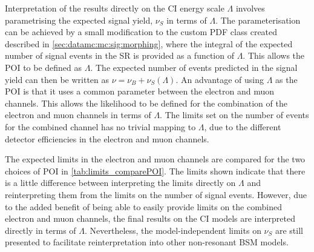 Interpretation of the results directly on the CI energy scale $\Lambda$ involves parametrising the expected signal yield, $\nu_S$ in terms of $\Lambda$. The parameterisation can be achieved by a small modification to the custom PDF class created described in \cref{sec:datamc:mc:sig:morphing}, where the integral of the expected number of signal events in the SR is provided as a function of $\Lambda$. This allows the POI to be defined as $\Lambda$. The expected number of events predicted in the signal yield can then be written as $\nu = \nu_B +\nu_S(\Lambda)$. An advantage of using $\Lambda$ as the POI is that it uses a common parameter between the electron and muon channels. This allows the likelihood to be defined for the combination of the electron and muon channels in terms of $\Lambda$. The limits set on the number of events for the combined channel has no trivial mapping to $\Lambda$, due to the different detector efficiencies in the electron and muon channels.  

The expected limits in the electron and muon channels are compared for the two choices of POI in \cref{tab:limits_comparePOI}. The limits shown indicate that there is a little difference between interpreting the limits directly on $\Lambda$ and reinterpreting them from the limits on the number of signal events. However, due to the added benefit of being able to easily provide limits on the combined electron and muon channels, the final results on the CI models are interpreted directly in terms of $\Lambda$. Nevertheless, the model-independent limits on $\nu_S$ are still presented to facilitate reinterpretation into other non-resonant BSM models. 

